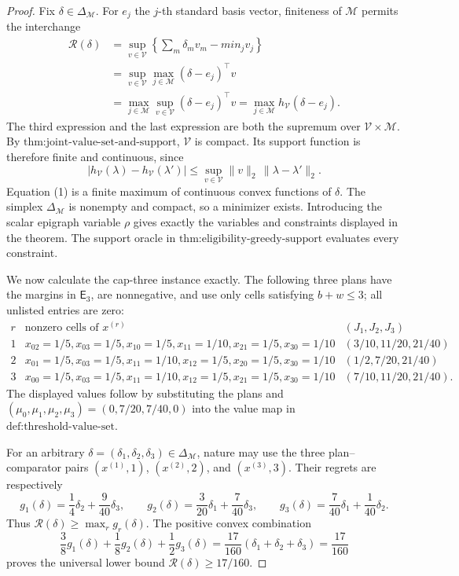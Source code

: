 \documentclass{article}
\begin{document}
\begin{proof}
Fix \(\delta\in\Delta_{\mathcal M}\). For \(e_j\) the \(j\)-th standard basis vector, finiteness of \(\mathcal M\) permits the interchange
\[
 \begin{aligned}
 \mathcal R(\delta)
 &=\sup_{v\in\mathcal V}\left\{\sum_m\delta_mv_m-min_jv_j\right\}\\
 &=\sup_{v\in\mathcal V}\max_{j\in\mathcal M}(\delta-e_j)^\top v\\
 &=\max_{j\in\mathcal M}\sup_{v\in\mathcal V}(\delta-e_j)^\top v
 =\max_{j\in\mathcal M}h_{\mathcal V}(\delta-e_j).
 \end{aligned}                                           \tag{1}
\]
The third expression and the last expression are both the supremum over \(\mathcal V\times\mathcal M\). By \(\text{thm:joint-value-set-and-support}\), \(\mathcal V\) is compact. Its support function is therefore finite and continuous, since
\[
 |h_{\mathcal V}(\lambda)-h_{\mathcal V}(\lambda')|
 \le \sup_{v\in\mathcal V}\|v\|_2\,\|\lambda-\lambda'\|_2. \tag{2}
\]
Equation (1) is a finite maximum of continuous convex functions of \(\delta\). The simplex \(\Delta_{\mathcal M}\) is nonempty and compact, so a minimizer exists. Introducing the scalar epigraph variable \(\rho\) gives exactly the variables and constraints displayed in the theorem. The support oracle in \(\text{thm:eligibility-greedy-support}\) evaluates every constraint.

We now calculate the cap-three instance exactly. The following three plans have the margins in \(\mathsf E_3\), are nonnegative, and use only cells satisfying \(b+w\le3\); all unlisted entries are zero:
\[
 \begin{array}{c|l|c}
 r&\text{nonzero cells of }x^{(r)}&(J_1,J_2,J_3)\\ \hline
 1&x_{02}=1/5, x_{03}=1/5, x_{10}=1/5, x_{11}=1/10,
      x_{21}=1/5, x_{30}=1/10&(3/10,11/20,21/40)\\
 2&x_{01}=1/5, x_{03}=1/5, x_{11}=1/10, x_{12}=1/5,
      x_{20}=1/5, x_{30}=1/10&(1/2,7/20,21/40)\\
 3&x_{00}=1/5, x_{03}=1/5, x_{11}=1/10, x_{12}=1/5,
      x_{21}=1/5, x_{30}=1/10&(7/10,11/20,21/40).
 \end{array}                                               \tag{3}
\]
The displayed values follow by substituting the plans and \((\mu_0,\mu_1,\mu_2,\mu_3)=(0,7/20,7/40,0)\) into the value map in \(\text{def:threshold-value-set}\).

For an arbitrary \(\delta=(\delta_1,\delta_2,\delta_3)\in\Delta_{\mathcal M}\), nature may use the three plan--comparator pairs \((x^{(1)},1)\), \((x^{(2)},2)\), and \((x^{(3)},3)\). Their regrets are respectively
\[
 g_1(\delta)=\frac14\delta_2+\frac9{40}\delta_3,\qquad
 g_2(\delta)=\frac3{20}\delta_1+\frac7{40}\delta_3,\qquad
 g_3(\delta)=\frac7{40}\delta_1+\frac1{40}\delta_2.     \tag{4}
\]
Thus \(\mathcal R(\delta)\ge\max_r g_r(\delta)\). The positive convex combination
\[
 \frac38g_1(\delta)+\frac18g_2(\delta)+\frac12g_3(\delta)
 =\frac{17}{160}(\delta_1+\delta_2+\delta_3)
 =\frac{17}{160}                                         \tag{5}
\]
proves the universal lower bound \(\mathcal R(\delta)\ge17/160\).


\end{proof}
\end{document}
